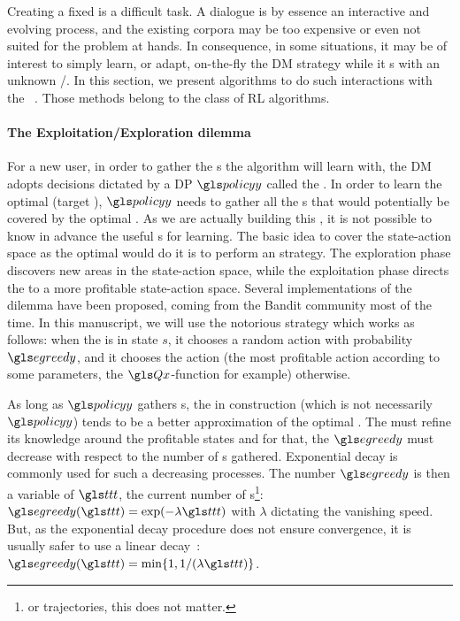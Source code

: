 Creating a fixed  is a difficult task. 
A dialogue is by essence an interactive and evolving process, and the existing corpora may be too expensive or even not suited for the problem at hands.
In consequence, in some situations, it may be of interest to simply learn, or adapt, on-the-fly the \gls{DM} strategy while it s with an unknown /. In this section, we present algorithms to do such interactions with the  ~\parencite{Ferreira2013}. Those methods belong to the class of  \gls{RL} algorithms.

\paragraph{The Exploitation/Exploration dilemma}

For a new user, in order to gather the s the algorithm will learn with, the \gls{DM} adopts decisions dictated by a \gls{DP} $\policy$ called the . In order to learn the optimal  (target ), $\policy$ needs to gather all the s that would potentially be covered by the optimal . As we are actually building this , it is not possible to know in advance the useful s for learning. The basic idea to cover the state-action space as the optimal  would do it is to perform an  strategy. The exploration phase discovers new areas in the state-action space, while the exploitation phase directs the  to a more profitable state-action space. Several implementations of the  dilemma have been proposed, coming from the Bandit community most of the time. In this manuscript, we will use the notorious  strategy which works as follows:
when the  is in state $s$, it chooses a random  action with probability $\egreedy$, and it chooses the  action (the most profitable action according to some parameters, the $\Q$-function for example) otherwise.

As long as $\policy$ gathers s, the  in construction (which is not necessarily  $\policy$) tends to be a better approximation of the optimal . The  must refine its knowledge around the profitable states and for that, the $\egreedy$ must decrease with respect to the number of s gathered.
Exponential decay is commonly used for such a decreasing processes.
The number $\egreedy$ is then a variable of {${\indextransition}$}, the current number of s\footnote{or trajectories, this does not matter.}: $\egreedy({{\indextransition}}) = \exp(-{\lambda} {{\indextransition}})$ with {$\lambda$} dictating the vanishing speed. But, as the exponential decay procedure does not ensure convergence, it is usually safer to use a linear decay~\parencite{auer2002finite}:
$\egreedy({{\indextransition}}) = \min\{1,1/(\lambda\indextransition)\}$.


